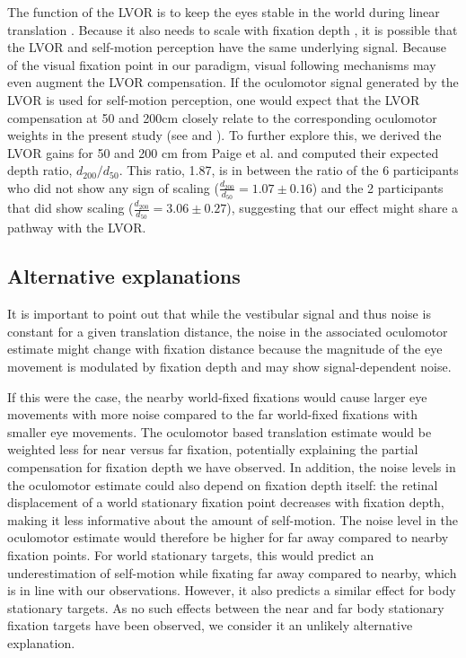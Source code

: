 The function of the LVOR is to keep the eyes stable in the world during linear translation \cite{paige1989,busettini1994,paige1998}. Because it also needs to scale with fixation depth \cite{angelaki2004}, it is possible that the LVOR and self-motion perception have the same underlying signal. Because of the visual fixation point in our paradigm, visual following mechanisms may even augment the LVOR compensation. If the oculomotor signal generated by the LVOR is used for self-motion perception, one would expect that the LVOR compensation at 50 and 200cm closely relate to the corresponding oculomotor weights in the present study (see  and ). To further explore this, we derived the LVOR gains for 50 and 200 \si{\centi\metre} from Paige et al. \citeyear{paige1989} and computed their expected depth ratio, $d_{200} / d_{50}$. This ratio, 1.87, is in between the ratio of the 6 participants who did not show any sign of scaling ($\frac{d_{200}}{d_{50}} = 1.07 \pm 0.16$) and the 2 participants that did show scaling ($\frac{d_{200}}{d_{50}} = 3.06 \pm 0.27$), suggesting that our effect might share a pathway with the LVOR.


\subsection{Alternative explanations}

It is important to point out that while the vestibular signal and thus noise is constant for a given translation distance, the noise in the associated oculomotor estimate might change with fixation distance because the magnitude of the eye movement is modulated by fixation depth and may show signal-dependent noise. 

If this were the case, the nearby world-fixed fixations would cause larger eye movements with more noise compared to the far world-fixed fixations with smaller eye movements. The oculomotor based translation estimate would be weighted less for near versus far fixation, potentially explaining the partial compensation for fixation depth we have observed. In addition, the noise levels in the oculomotor estimate could also depend on fixation depth itself: the retinal displacement of a world stationary fixation point decreases with fixation depth, making it less informative about the amount of self-motion. The noise level in the oculomotor estimate would therefore be higher for far away compared to nearby fixation points. For world stationary targets, this would predict an underestimation of self-motion while fixating far away compared to nearby, which is in line with our observations. However, it also predicts a similar effect for body stationary targets. As no such effects between the near and far body stationary fixation targets have been observed, we consider it an unlikely alternative explanation.
 
